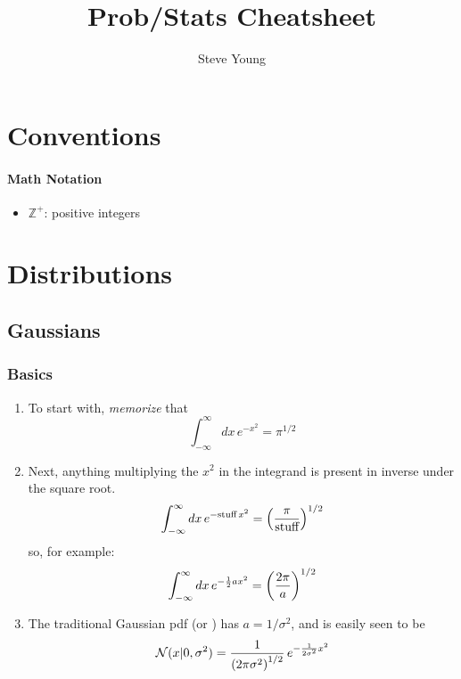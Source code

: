\documentclass[11pt]{article}
\title{Prob/Stats Cheatsheet}
\author{Steve Young}
\begin{document}
\maketitle

\section{Conventions}
\paragraph{Math Notation}
\begin{itemize}
  \item $\mathbb{Z^+}$: positive integers
\end{itemize}


\section{Distributions}
\subsection{Gaussians}
\subsubsection{Basics}
\begin{enumerate}
  \item To start with, \emph{memorize} that
  \begin{equation}
    \boxed{\int_{-\infty}^{\infty} dx\, e^{-x^2} = \pi^{1/2}}
  \end{equation}

  \item Next, anything multiplying the $x^2$ in the integrand is present in inverse
  under the square root.
  \begin{equation}
    \int_{-\infty}^{\infty} dx\, e^{-\textrm{stuff}\, x^2} =
    \left( \frac{\pi}{\textrm{stuff}} \right)^{1/2}
  \end{equation}
  so, for example:
  \begin{equation}
    \label{eq:int_gauss_a2}
    \int_{-\infty}^{\infty} dx\, e^{-\frac{1}{2} a x^2} = \left( \frac{2 \pi}{a} \right)^{1/2} 
  \end{equation}

  \item The traditional Gaussian pdf (or ) has
  $a = 1 / \sigma^2$, and is easily seen to be
  \begin{equation}
    \mathcal{N}(x|0,\sigma^2) = \frac{1}{\left( 2 \pi \sigma^2 \right)^{1/2}}\,
    e^{-\frac{1}{2 \sigma^2} x^2}
  \end{equation}
\end{enumerate}
\end{document}
